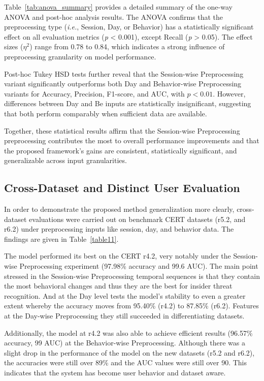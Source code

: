 Table~\ref{tab:anova_summary} provides a detailed summary of the one-way ANOVA and post-hoc analysis results. The ANOVA confirms that the preprocessing type (\textit{i.e.}, Session, Day, or Behavior) has a statistically significant effect on all evaluation metrics (\textit{p} < 0.001), except Recall (\textit{p} > 0.05). The effect sizes ($\eta^2$) range from 0.78 to 0.84, which indicates a strong influence of preprocessing granularity on model performance. 

Post-hoc Tukey HSD tests further reveal that the Session-wise Preprocessing variant significantly outperforms both Day and Behavior-wise Preprocessing variants for Accuracy, Precision, F1-score, and AUC, with $p<0.01$. However, differences between Day and Be inputs are statistically insignificant, suggesting that both perform comparably when sufficient data are available. 

Together, these statistical results affirm that the Session-wise Preprocessing preprocessing contributes the most to overall performance improvements and that the proposed framework’s gains are consistent, statistically significant, and generalizable across input granularities.


\subsection{Cross-Dataset and Distinct User Evaluation}

In order to demonstrate the proposed method generalization more clearly, cross-dataset evaluations were carried out on benchmark CERT datasets (r5.2, and r6.2) under preprocessing inputs like session, day, and behavior data. The findings are given in Table~\ref{table11}. 

The model performed its best on the CERT r4.2, very notably under the Session-wise Preprocessing experiment (97.98\% accuracy and 99.6 AUC). The main point stressed in the Session-wise Preprocessing temporal sequences is that they contain the most behavioral changes and thus they are the best for insider threat recognition. 
And at the Day level tests the model's stability to even a greater extent whereby the accuracy moves from 95.40\% (r4.2) to 87.85\% (r6.2). Features at the Day-wise Preprocessing they still succeeded in differentiating datasets. 

Additionally, the model at r4.2 was also able to achieve efficient results (96.57\% accuracy, 99 AUC) at the Behavior-wise Preprocessing. Although there was a slight drop in the performance of the model on the new datasets (r5.2 and r6.2), the accuracies were still over 89\% and the AUC values were still over 90. This indicates that the system has become user behavior and dataset aware. 

